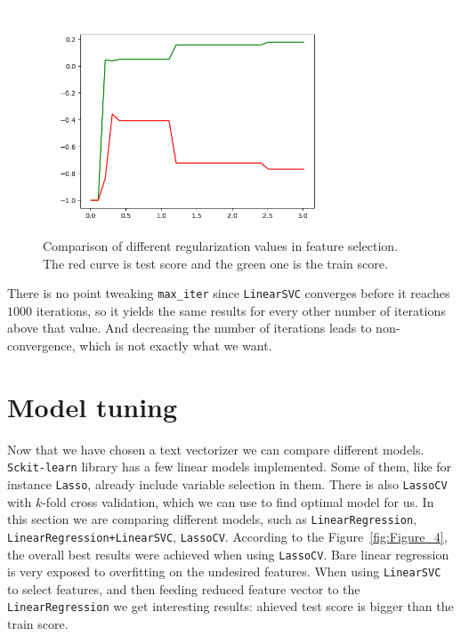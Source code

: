 \documentclass{article}
\begin{document}
\begin{figure}[h!]
    \centering
    \includegraphics[width=0.8\textwidth]{Figure_3.png}
    \caption{Comparison of different regularization values in feature selection.
    The red curve is test score and the green one is the train score.}\label{fig:Figure_3}
\end{figure}

There is no point tweaking \lstinline{max_iter} since \lstinline{LinearSVC} converges before it reaches $1000$ iterations,
so it yields the same results for every other number of iterations above that value. And decreasing the number of iterations
leads to non-convergence, which is not exactly what we want. 

\section{Model tuning}
Now that we have chosen a text vectorizer we can compare different models. \lstinline{Sckit-learn} library has a few
linear models implemented. Some of them, like for instance \lstinline{Lasso}, already include variable selection in them.
There is also \lstinline{LassoCV} with $k$-fold cross validation, which we can use to find optimal model for us.
In this section we are comparing different models, such as \lstinline{LinearRegression}, \lstinline{LinearRegression+LinearSVC},
\lstinline{LassoCV}. According to the Figure~\ref{fig:Figure_4}, the overall best results were achieved when using \lstinline{LassoCV}.
Bare linear regression is very exposed to overfitting on the undesired features. When using \lstinline{LinearSVC} to select features,
and then feeding reduced feature vector to the \lstinline{LinearRegression} we get interesting results: ahieved test score is 
bigger than the train score.
\end{document}

